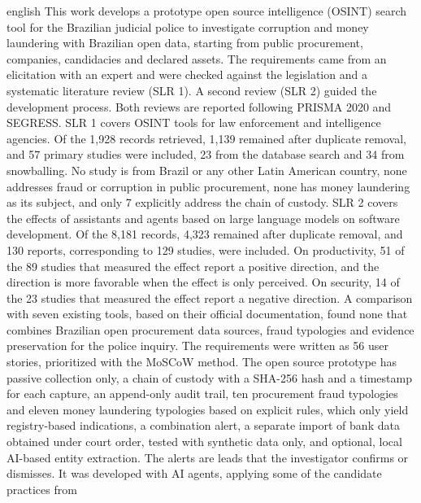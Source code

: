 \begin{resumo}[Abstract]
 \begin{otherlanguage*}{english}
   This work develops a prototype open source intelligence (OSINT) search
   tool for the Brazilian judicial police to investigate corruption and money
   laundering with Brazilian open data, starting from public procurement,
   companies, candidacies and declared assets. The requirements came from an elicitation with an expert and
   were checked against the legislation and a systematic literature review
   (SLR 1). A second review (SLR 2) guided the development process. Both
   reviews are reported following PRISMA 2020 and SEGRESS. SLR 1 covers OSINT
   tools for law enforcement and intelligence agencies. Of the 1,928 records
   retrieved, 1,139 remained after duplicate removal, and 57 primary studies
   were included, 23 from the database search and 34 from snowballing. No
   study is from Brazil or any other Latin American country, none addresses
   fraud or corruption in public procurement, none has money laundering as
   its subject, and only 7 explicitly address the chain of custody. SLR 2 covers the effects of
   assistants and agents based on large language models on software
   development. Of the 8,181 records, 4,323 remained after duplicate removal,
   and 130 reports, corresponding to 129 studies, were included. On
   productivity, 51 of the 89 studies that measured the effect report a
   positive direction, and the direction is more favorable when the effect is
   only perceived. On security, 14 of the 23 studies that measured the effect
   report a negative direction. A comparison with seven existing tools, based
   on their official documentation, found none that combines Brazilian open
   procurement data sources, fraud typologies and evidence preservation for
   the police inquiry. The requirements were written as 56 user stories,
   prioritized with the MoSCoW method. The open source prototype has passive
   collection only, a chain of custody with a SHA-256 hash and a timestamp for
   each capture, an append-only audit trail, ten procurement fraud
   typologies and eleven money laundering typologies based on explicit
   rules, which only yield registry-based indications, a combination alert,
   a separate import of bank data obtained under court order, tested with
   synthetic data only, and optional, local AI-based entity extraction. The
   alerts are leads that the investigator confirms or dismisses. It was
   developed with AI agents, applying some of the candidate practices from

\end{otherlanguage*}
\end{resumo}
